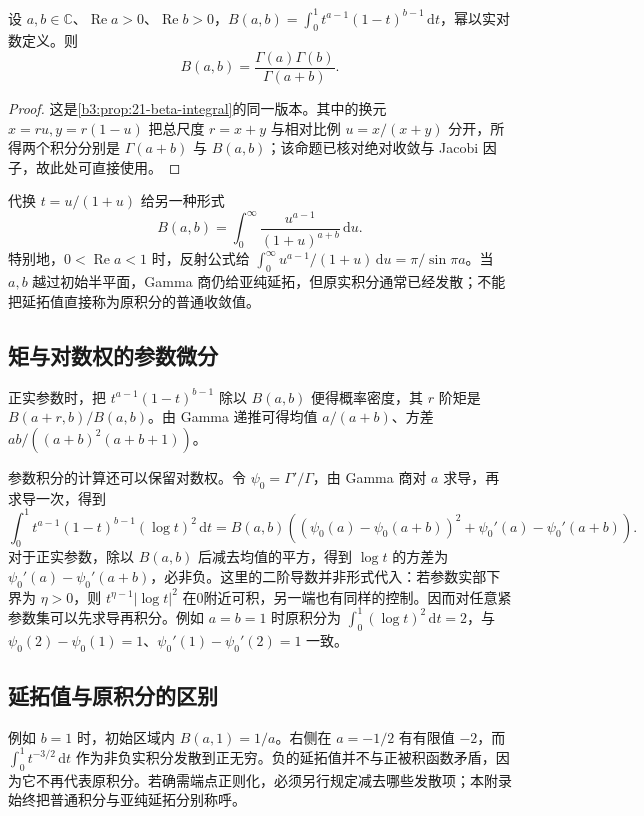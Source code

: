 \begin{theorem}\label{b3:thm:F-beta-gamma}
设 \(a,b\in\mathbb C\)、\(\operatorname{Re}a>0\)、\(\operatorname{Re}b>0\)，\(B(a,b)=\int_0^1t^{a-1}(1-t)^{b-1}\,\mathrm dt\)，幂以实对数定义。则
\[
 B(a,b)=\frac{\Gamma(a)\Gamma(b)}{\Gamma(a+b)}.
\]
\end{theorem}
\begin{proof}
这是\cref{b3:prop:21-beta-integral}的同一版本。其中的换元 \(x=ru,y=r(1-u)\) 把总尺度 \(r=x+y\) 与相对比例 \(u=x/(x+y)\) 分开，所得两个积分分别是 \(\Gamma(a+b)\) 与 \(B(a,b)\)；该命题已核对绝对收敛与 Jacobi 因子，故此处可直接使用。
\end{proof}
代换 \(t=u/(1+u)\) 给另一种形式
\[
 B(a,b)=\int_0^\infty\frac{u^{a-1}}{(1+u)^{a+b}}\,\mathrm{d}u.
\]
特别地，\(0<\operatorname{Re}a<1\) 时，反射公式给
\(\int_0^\infty u^{a-1}/(1+u)\,\mathrm{d}u=\pi/\sin\pi a\)。当 \(a,b\) 越过初始半平面，Gamma 商仍给亚纯延拓，但原实积分通常已经发散；不能把延拓值直接称为原积分的普通收敛值。
\ProseParagraphBreak
\subsection{矩与对数权的参数微分}
\label{b3:subsec:F0102}

正实参数时，把 \(t^{a-1}(1-t)^{b-1}\) 除以 \(B(a,b)\) 便得概率密度，其 \(r\) 阶矩是 \(B(a+r,b)/B(a,b)\)。由 Gamma 递推可得均值 \(a/(a+b)\)、方差 \(ab/((a+b)^2(a+b+1))\)。

参数积分的计算还可以保留对数权。令 \(\psi_0=\Gamma'/\Gamma\)，由 Gamma 商对 \(a\) 求导，再求导一次，得到
\[
\int_0^1t^{a-1}(1-t)^{b-1}(\log t)^2\,\mathrm{d}t
=B(a,b)\left((\psi_0(a)-\psi_0(a+b))^2+
\psi_0'(a)-\psi_0'(a+b)\right).
\]
对于正实参数，除以 \(B(a,b)\) 后减去均值的平方，得到 \(\log t\) 的方差为 \(\psi_0'(a)-\psi_0'(a+b)\)，必非负。这里的二阶导数并非形式代入：若参数实部下界为 \(\eta>0\)，则 \(t^{\eta-1}|\log t|^2\) 在0附近可积，另一端也有同样的控制。因而对任意紧参数集可以先求导再积分。例如 \(a=b=1\) 时原积分为 \(\int_0^1(\log t)^2\,\mathrm{d}t=2\)，与 \(\psi_0(2)-\psi_0(1)=1\)、\(\psi_0'(1)-\psi_0'(2)=1\) 一致。


\subsection{延拓值与原积分的区别}
\label{b3:subsec:F0103}

例如 \(b=1\) 时，初始区域内 \(B(a,1)=1/a\)。右侧在 \(a=-1/2\) 有有限值 \(-2\)，而 \(\int_0^1t^{-3/2}\,\mathrm{d}t\) 作为非负实积分发散到正无穷。负的延拓值并不与正被积函数矛盾，因为它不再代表原积分。若确需端点正则化，必须另行规定减去哪些发散项；本附录始终把普通积分与亚纯延拓分别称呼。

